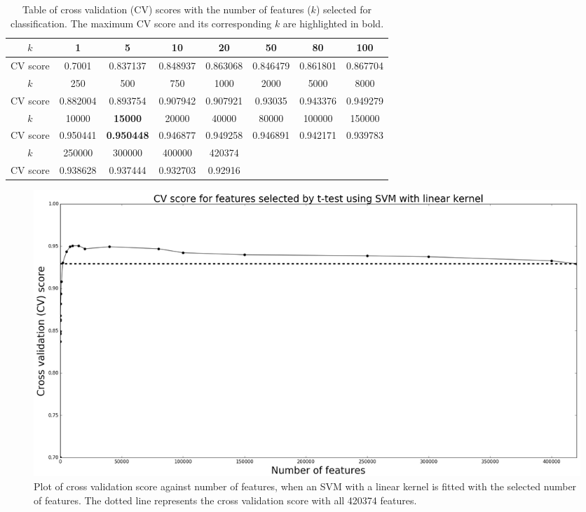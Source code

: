 \documentclass[12pt, twoside, a4paper]{report}
\begin{document}
\begin{table}[]
\centering
\begin{tabular}{|c||c|c|c|c|c|c|c|}
\hline
$k$      & 1        & 5        & 10       & 20       & 50       & 80       & 100      \\ \hline
CV score & 0.7001   & 0.837137 & 0.848937 & 0.863068 & 0.846479 & 0.861801 & 0.867704 \\ \hline \hline
$k$      & 250      & 500      & 750      & 1000     & 2000     & 5000     & 8000     \\ \hline
CV score & 0.882004 & 0.893754 & 0.907942 & 0.907921 & 0.93035  & 0.943376 & 0.949279 \\ \hline \hline
$k$      & 10000    & \textbf{15000}    & 20000    & 40000    & 80000    & 100000   & 150000   \\ \hline
CV score & 0.950441 & \textbf{0.950448} & 0.946877 & 0.949258 & 0.946891 & 0.942171 & 0.939783 \\ \hline \hline
$k$      & 250000   & 300000   & 400000   & 420374   &          &          &          \\ \hline
CV score & 0.938628 & 0.937444 & 0.932703 & 0.92916  &          &          &          \\ \hline
\end{tabular}
\caption{Table of cross validation (CV) scores with the number of features ($k$) selected for classification. The maximum CV score and its corresponding $k$ are highlighted in bold.}
\label{t_test:table:range}
\end{table}

\begin{figure}
\centering
\includegraphics[width=\textwidth]{images/t_test_range.jpeg}
\caption{Plot of cross validation score against number of features, when an SVM with a linear kernel is fitted with the selected number of features. The dotted line represents the cross validation score with all 420374 features.}
\label{body:t_test:fig:range}
\end{figure}
\end{document}
